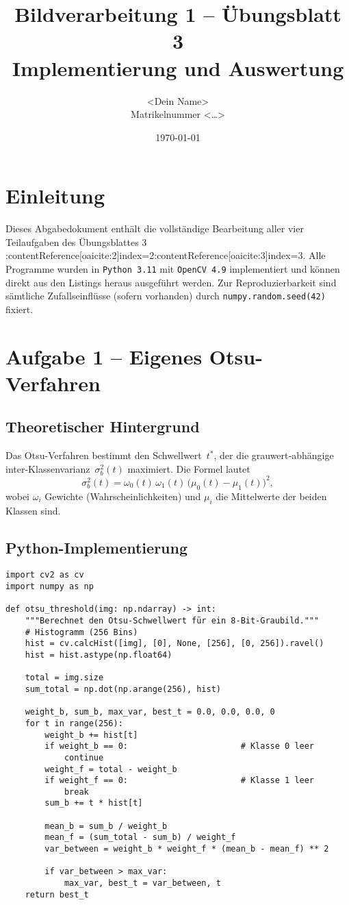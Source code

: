 \documentclass[a4paper,11pt]{article}
\title{Bildverarbeitung 1 – Übungsblatt 3\\
       \large Implementierung und Auswertung}
\author{<Dein Name>  \\  Matrikelnummer <…>}
\date{\today}
\begin{document}
\maketitle
\tableofcontents
\newpage

\section{Einleitung}
Dieses Abgabedokument enthält die vollständige Bearbeitung aller vier Teilaufgaben des
Übungsblattes 3 :contentReference[oaicite:2]{index=2}:contentReference[oaicite:3]{index=3}.
Alle Programme wurden in \texttt{Python~3.11} mit \texttt{OpenCV~4.9} implementiert
und können direkt aus den Listings heraus ausgeführt werden.
Zur Reproduzierbarkeit sind sämtliche Zufallseinflüsse (sofern vorhanden) durch
\texttt{numpy.random.seed(42)} fixiert.

\section{Aufgabe 1 – Eigenes Otsu-Verfahren}
\subsection{Theoretischer Hintergrund}
Das Otsu-Verfahren bestimmt den Schwellwert~$t^\ast$, der die
grauwert‐abhängige inter-Klassenvarianz~$\sigma_b^2(t)$ maximiert.
Die Formel lautet
\[
  \sigma_b^2(t) = \omega_0(t)\,\omega_1(t)\,\bigl(\mu_0(t)-\mu_1(t)\bigr)^2,
\]
wobei $\omega_i$ Gewichte (Wahrscheinlichkeiten) und $\mu_i$ die Mittelwerte der beiden Klassen sind.

\subsection{Python-Implementierung}
\begin{lstlisting}[caption={Naive Otsu-Schwellwertbestimmung}]
import cv2 as cv
import numpy as np

def otsu_threshold(img: np.ndarray) -> int:
    """Berechnet den Otsu-Schwellwert für ein 8-Bit-Graubild."""
    # Histogramm (256 Bins)
    hist = cv.calcHist([img], [0], None, [256], [0, 256]).ravel()
    hist = hist.astype(np.float64)

    total = img.size
    sum_total = np.dot(np.arange(256), hist)

    weight_b, sum_b, max_var, best_t = 0.0, 0.0, 0.0, 0
    for t in range(256):
        weight_b += hist[t]
        if weight_b == 0:                       # Klasse 0 leer
            continue
        weight_f = total - weight_b
        if weight_f == 0:                       # Klasse 1 leer
            break
        sum_b += t * hist[t]

        mean_b = sum_b / weight_b
        mean_f = (sum_total - sum_b) / weight_f
        var_between = weight_b * weight_f * (mean_b - mean_f) ** 2

        if var_between > max_var:
            max_var, best_t = var_between, t
    return best_t
\end{lstlisting}
\end{document}
